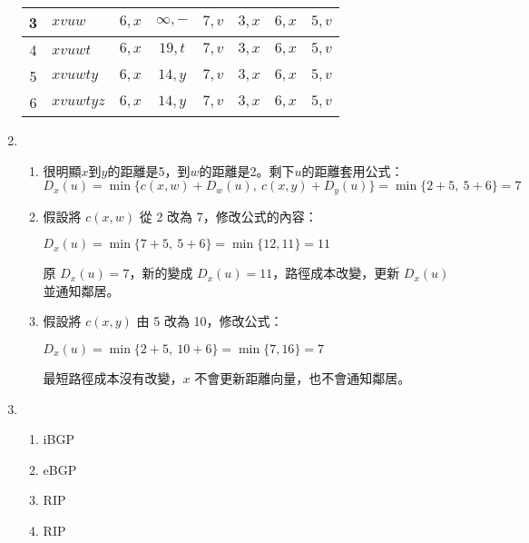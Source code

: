 \documentclass[12pt,a4paper]{article}
\begin{document}
\begin{enumerate}
\begin{table}[H]
\begin{tabular}{|c|l|c|c|c|c|c|c|}
    3 & $xvuw$           & $6,x$         & $\infty,-$    & $7,v$         & $3,x$         & $6,x$         & $5,v$         \\ \hline
    4 & $xvuwt$          & $6,x$         & $19,t$        & $7,v$         & $3,x$         & $6,x$         & $5,v$         \\ \hline
    5 & $xvuwty$         & $6,x$         & $14,y$        & $7,v$         & $3,x$         & $6,x$         & $5,v$         \\ \hline
    6 & $xvuwtyz$        & $6,x$         & $14,y$        & $7,v$         & $3,x$         & $6,x$         & $5,v$         \\ \hline
    \end{tabular}
    \end{table}
    \item \begin{enumerate}
        \item 很明顯$x$到$y$的距離是5，到$w$的距離是2。剩下$u$的距離套用公式：
    $D_x(u) = \min\{c(x,w) + D_w(u),\ c(x,y) + D_y(u)\} = \min\{2+5,\ 5+6\} = 7$
    \item 假設將 $c(x, w)$ 從 2 改為 7，修改公式的內容：
    
    $
    D_x(u) = \min\{7 + 5,\ 5 + 6\} = \min\{12, 11\} = 11
    $

    原 $D_x(u) = 7$，新的變成 $D_x(u) = 11$，路徑成本改變，更新 $D_x(u)$ 並通知鄰居。
    \item 假設將 $c(x, y)$ 由 5 改為 10，修改公式：

    $
    D_x(u) = \min\{2 + 5,\ 10 + 6\} = \min\{7, 16\} = 7
    $

    最短路徑成本沒有改變，$x$ 不會更新距離向量，也不會通知鄰居。
    \end{enumerate}
    \item \begin{enumerate}
        \item iBGP
        \item eBGP
        \item RIP
        \item RIP
    \end{enumerate}


\end{enumerate}
\end{document}
